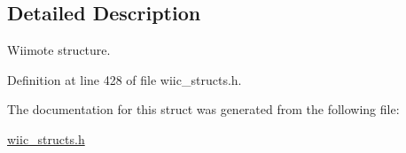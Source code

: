 \subsection{\-Detailed \-Description}
\-Wiimote structure. 

\-Definition at line 428 of file wiic\-\_\-structs.\-h.



\-The documentation for this struct was generated from the following file\-:\begin{DoxyCompactItemize}
\item 
\hyperlink{wiic__structs_8h}{wiic\-\_\-structs.\-h}\end{DoxyCompactItemize}
